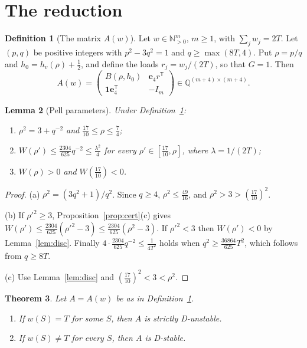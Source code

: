 \documentclass[11pt,a4paper]{article}
\theoremstyle{plain}
\newtheorem{theorem}{Theorem}[section]
\newtheorem{lemma}[theorem]{Lemma}
\theoremstyle{definition}
\newtheorem{definition}[theorem]{Definition}
\theoremstyle{remark}
\newcommand{\Q}{\mathbb{Q}}
\newcommand{\N}{\mathbb{N}}
\newcommand{\one}{\mathbf{1}}
\newcommand{\be}{\mathbf{e}}
\begin{document}
\section{The reduction}\label{sec:reduction}

\begin{definition}[The matrix $A(w)$]\label{def:reduction}
Let $w\in\N_{>0}^m$, $m\ge1$, with $\sum_jw_j=2T$. Let $(p,q)$ be positive integers with
$p^2-3q^2=1$ and $q\ge\max(8T,4)$. Put $\rho=p/q$ and $h_0=h_v(\rho)+\tfrac12$, and
define the loads $r_j=w_j/(2T)$, so that $G=1$. Then
\[
A(w)=\begin{pmatrix}B(\rho,h_0)&\be_4r^{\mathsf T}\\ \one \be_4^{\mathsf T}&-I_m\end{pmatrix}\in\Q^{(m+4)\times(m+4)}.
\]
\end{definition}

\begin{lemma}[Pell parameters]\label{lem:pell}
Under Definition~\ref{def:reduction}:
\begin{enumerate}[label=(\alph*)]
\item $\rho^2=3+q^{-2}$ and $\tfrac{17}{10}\le\rho\le\tfrac74$;
\item $W(\rho')\le\tfrac{2304}{625}q^{-2}\le\tfrac{\lambda^2}{4}$ for every
$\rho'\in[\tfrac{17}{10},\rho]$, where $\lambda=1/(2T)$;
\item $W(\rho)>0$ and $W(\tfrac{17}{10})<0$.
\end{enumerate}
\end{lemma}
\begin{proof}
(a) $\rho^2=(3q^2+1)/q^2$. Since $q\ge4$, $\rho^2\le\tfrac{49}{16}$, and
$\rho^2>3>(\tfrac{17}{10})^2$.

(b) If $\rho'^2\ge3$, Proposition~\ref{prop:cert}(c) gives
$W(\rho')\le\tfrac{2304}{625}(\rho'^2-3)\le\tfrac{2304}{625}(\rho^2-3)$. If $\rho'^2<3$ then
$W(\rho')<0$ by Lemma~\ref{lem:disc}. Finally $4\cdot\tfrac{2304}{625}q^{-2}\le\tfrac{1}{4T^2}$
holds when $q^2\ge\tfrac{36864}{625}T^2$, which follows from $q\ge8T$.

(c) Use Lemma~\ref{lem:disc} and $(\tfrac{17}{10})^2<3<\rho^2$.
\end{proof}

\begin{theorem}\label{thm:main}
Let $A=A(w)$ be as in Definition~\ref{def:reduction}.
\begin{enumerate}[label=(\roman*)]
\item If $w(S)=T$ for some $S$, then $A$ is strictly D-unstable.
\item If $w(S)\ne T$ for every $S$, then $A$ is D-stable.
\end{enumerate}
\end{theorem}
\end{document}
